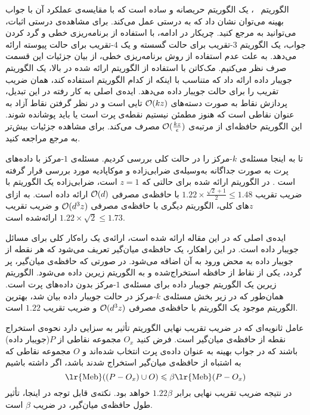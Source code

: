 الگوریتم ~، یک الگوریتم حریصانه و ساده است که با مقایسه‌ی عملکرد آن با جواب بهینه می‌توان نشان داد که به درستی عمل می‌کند.
برای مشاهده‌ی درستی اثبات، می‌توانید به مرجع   کنید.
چریکار در ادامه، با استفاده از برنامه‌ریزی خطی و گرد کردن جواب، یک الگوریتم $3$-تقریب برای حالت گسسته و یک $4$-تقریب برای حالت پیوسته ارائه می‌دهد.
به علت عدم استفاده از روش برنامه‌ریزی خطی، از بیان جزئیات این قسمت صرف نظر می‌کنیم.
مک‌کاتن با استفاده از الگوریتم ارائه شده در بالا، یک الگوریتم جویبار داده ارائه داد که متناسب با اینکه از کدام الگوریتم استفاده کند، همان ضریب تقریب را  برای حالت جویبار داده می‌دهد.
ایده‌ی اصلی به‌ کار رفته در این تبدیل، پردازش نقاط به صورت دسته‌های $\mathcal{O}(kz)$ تایی است و در نظر گرفتن نقاط آزاد به عنوان نقاطی است که هنوز مطمئن نیستیم نقطه‌ی پرت است یا باید پوشانده شوند.
این الگوریتم حافظه‌ای از مرتبه‌ی $\mathcal{O}(\frac{kz}{\epsilon})$ مصرف می‌کند.
برای مشاهده جزئیات بیش‌تر به مرجع  مراجعه کنید.

تا به اینجا مسئله‌ی $k$-مرکز را در حالت کلی بررسی کردیم.
مسئله‌ی $1$-مرکز با داده‌های پرت به صورت جداگانه به‌وسیله‌ی ضرابی‌زاده و موکاپادیه مورد بررسی قرار گرفته است .
در الگوریتم ارائه شده برای حالتی که $z = 1$ است، ضرابی‌زاده یک الگوریتم با ضریب تقریب $1.22 \times \frac{\sqrt{2} + 1}{2} \leq 1.48$ با حافظه‌ی مصرفی $\mathcal{O}(d)$ ارائه داده است.
به ازای $z$های کلی، الگوریتم دیگری با حافظه‌ی مصرفی $\mathcal{O}(d^3z)$ و ضریب تقریب $1.22 \times \sqrt{2} \leq 1.73$ ارائه‌شده است.

ایده‌ی اصلی که در این مقاله ارائه شده است، ارائه‌ی یک راه‌کار کلی برای مسائل جویبار داده است.
در این راهکار، یک حافظه‌ی میان‌گیر تعریف می‌شود که هر نقطه از جویبار داده به محض ورود به آن اضافه می‌شود.
در صورتی که حافظه‌ی میان‌گیر، پر گردد، یکی از نقاط از حافظه استخراج‌شده و به الگوریتم زیرین داده می‌شود.
الگوریتم زیرین یک الگوریتم جویبار داده برای مسئله‌ی $1$-مرکز بدون داده‌های پرت است.
همان‌طور که در زیر بخش مسئله‌ی $k$-مرکز در حالت جویبار داده بیان شد، بهترین الگوریتم موجود یک الگوریتم با حافظه‌ی مصرفی $\mathcal{O}(d^3z)$ و ضریب تقریب $1.22$ است.

عامل ثانویه‌ای که در ضریب تقریب نهایی الگوریتم تأثیر به سزایی دارد نحوه‌ی استخراج نقطه از حافظه‌ی میان‌گیر است.
فرض کنید $O_x$ مجموعه نقاطی از $P$(جویبار داده) باشند که در جواب بهینه به عنوان داده‌ی پرت انتخاب شده‌اند و $O$ مجموعه نقاطی که به اشتباه از حافظه‌ی میان‌گیر استخراج شدند باشد، اگر داشته باشیم
$$\text{\lr{Meb}}((P - O_x) \cup O) \leq \beta \text{\lr{Meb}}(P - O_x)$$
در نتیجه ضریب تقریب نهایی برابر $1.22 \beta$ خواهد بود.
نکته‌ی قابل توجه در اینجا، تأثیر طول حافظه‌ی میان‌گیر، در ضریب $\beta$ است.


